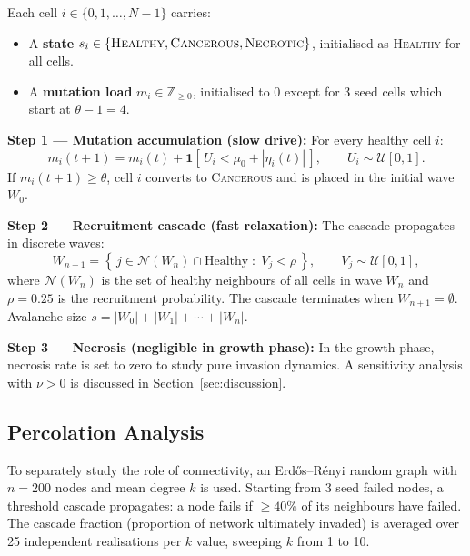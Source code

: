 \documentclass[12pt,a4paper]{article}
\begin{document}
Each cell $i \in \{0, 1, \ldots, N-1\}$ carries:
\begin{itemize}[leftmargin=1.5em]
  \item A \textbf{state} $s_i \in \{\textsc{Healthy}, \textsc{Cancerous},
        \textsc{Necrotic}\}$, initialised as \textsc{Healthy} for all cells.
  \item A \textbf{mutation load} $m_i \in \mathbb{Z}_{\geq 0}$, initialised
        to 0 except for 3 seed cells which start at $\theta - 1 = 4$.
\end{itemize}

\textbf{Step 1 — Mutation accumulation (slow drive):}
For every healthy cell $i$:
\begin{equation}
  m_i(t+1) = m_i(t) + \mathbf{1}\!\left[\,U_i < \mu_0 + |\eta_i(t)|\,\right],
  \qquad U_i \sim \mathcal{U}[0,1].
\end{equation}
If $m_i(t+1) \geq \theta$, cell $i$ converts to \textsc{Cancerous} and is
placed in the initial wave $W_0$.

\textbf{Step 2 — Recruitment cascade (fast relaxation):}
The cascade propagates in discrete waves:
\begin{equation}
  W_{n+1} = \left\{\, j \in \mathcal{N}(W_n) \cap \text{Healthy}
  \;:\; V_j < \rho \,\right\},
  \qquad V_j \sim \mathcal{U}[0,1],
\end{equation}
where $\mathcal{N}(W_n)$ is the set of healthy neighbours of all cells in
wave $W_n$ and $\rho = 0.25$ is the recruitment probability.  The cascade
terminates when $W_{n+1} = \emptyset$.  Avalanche size $s = |W_0| + |W_1|
+ \cdots + |W_n|$.

\textbf{Step 3 — Necrosis (negligible in growth phase):}
In the growth phase, necrosis rate is set to zero to study pure invasion
dynamics.  A sensitivity analysis with $\nu > 0$ is discussed in
Section~\ref{sec:discussion}.

\subsection{Percolation Analysis}

To separately study the role of connectivity, an Erd\H{o}s--R\'{e}nyi random
graph with $n = 200$ nodes and mean degree $k$ is used.  Starting from 3
seed failed nodes, a threshold cascade propagates: a node fails if $\geq 40\%$
of its neighbours have failed.  The cascade fraction (proportion of network
ultimately invaded) is averaged over 25 independent realisations per $k$ value,
sweeping $k$ from 1 to 10.
\end{document}
